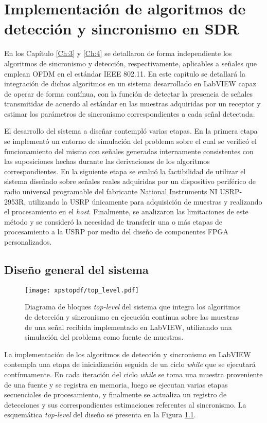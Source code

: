\chapter{Implementación de algoritmos de detección y sincronismo en SDR}
\label{Ch:5}
\graphicspath{{figs/}}

En los Capítulo \ref{Ch:3} y \ref{Ch:4} se detallaron de forma independiente los algoritmos de sincronismo y detección, respectivamente, aplicables a señales que emplean OFDM en el estándar IEEE 802.11. En este capítulo se detallará la integración de dichos algoritmos en un sistema desarrollado en LabVIEW capaz de operar de forma contínua, con la función de detectar la presencia de señales transmitidas de acuerdo al estándar en las muestras adquiridas por un receptor y estimar los parámetros de sincronismo correspondientes a cada señal detectada. 

El desarrollo del sistema a diseñar contempló varias etapas. En la primera etapa se implementó un entorno de simulación del problema sobre el cual se verificó el funcionamiento del mismo con señales generadas internamente consistentes con las suposiciones hechas durante las derivaciones de los algoritmos correspondientes. En la siguiente etapa se evaluó la factibilidad de utilizar el sistema diseñado sobre señales reales adquiridas por un dispositivo periférico de radio universal programable del fabricante National Instruments NI USRP-2953R, utilizando la USRP únicamente para adquisición de muestras y realizando el procesamiento en el \textit{host}. Finalmente, se analizaron las limitaciones de este método y se consideró la necesidad de transferir una o más etapas de procesamiento a la USRP por medio del diseño de componentes FPGA personalizados.

\section{Diseño general del sistema}
\label{S:ch5-general}

\begin{figure}[t]
    \centering{}\texttt{[image: xpstopdf/top\_level.pdf]}
    \caption{Diagrama de bloques \textit{top-level} del sistema que integra los algoritmos de detección y sincronismo en ejecución contínua sobre las muestras de una señal recibida implementado en LabVIEW, utilizando una simulación del problema como fuente de muestras.\label{fig:top-level-lv}}  
\end{figure}

La implementación de los algoritmos de detección y sincronismo en LabVIEW contempla una etapa de inicialización seguida de un ciclo \textit{while} que se ejecutará contínuamente. En cada iteración del ciclo \textit{while} se toma una muestra proveniente de una fuente y se registra en memoria, luego se ejecutan varias etapas secuenciales de procesamiento, y finalmente se actualiza un registro de detecciones y sus correspondientes estimaciones referentes al sincronismo. La esquemática \textit{top-level} del diseño se presenta en la Figura \ref{fig:top-level-lv}.

